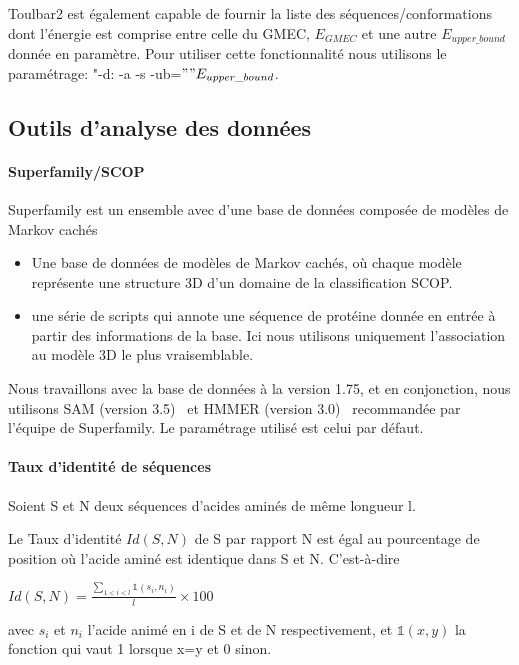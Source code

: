 Toulbar2 est également capable de fournir la liste des séquences/conformations dont l'énergie est comprise entre celle du GMEC, $E_{GMEC}$ et une autre $E_{upper\_bound}$ donnée en paramètre. Pour utiliser cette fonctionnalité nous utilisons le paramétrage:  "-d: -a -s -ub=$""E_{upper\_bound}$.

\subsection{Outils d'analyse des données} 
   \paragraph{Superfamily/SCOP} 

Superfamily est un ensemble avec d'une base de données composée de modèles de Markov cachés~\citep{refSuperfamily}

\begin{itemize}
\item Une base de données de modèles de Markov cachés, où chaque modèle représente une structure 3D d'un domaine de la classification SCOP.
\item une série de scripts qui annote une séquence de protéine donnée en entrée à partir des informations de la base. Ici nous utilisons uniquement l'association au modèle 3D le plus vraisemblable. 
\end{itemize}

Nous travaillons avec la base de données à la version 1.75, et en conjonction, nous utilisons SAM (version 3.5)~\citep{refSam} et HMMER (version 3.0)~\citep{refHmmer} recommandée par l'équipe de Superfamily. Le paramétrage utilisé est celui par défaut.

\paragraph{Taux d'identité de séquences}

Soient S et N deux séquences d'acides aminés de même longueur l.

Le Taux d'identité $Id(S,N)$ de S par rapport N est égal au pourcentage de position où l'acide aminé est identique dans S et N. C'est-à-dire

  $ Id(S,N) =\frac{\sum_{1<i<l} \mathds{1}(s_i,n_i)}{l} \times 100$ 

avec $s_i$ et $n_i$ l'acide animé en i de S et de N respectivement, et $\mathds{1}(x,y)$ la fonction qui vaut 1 lorsque x=y et 0 sinon. 

